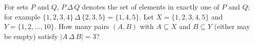 For sets $P$ and $Q$, $P\,\Delta\,Q$ denotes the set of elements in exactly one of $P$ and $Q$; for example $\{1,2,3,4\}\,\Delta\,\{2,3,5\}=\{1,4,5\}$. Let $X=\{1,2,3,4,5\}$ and $Y=\{1,2,\dots,10\}$. How many pairs $(A,B)$ with $A\subseteq X$ and $B\subseteq Y$ (either may be empty) satisfy $\left|A\,\Delta\,B\right|=3$?
